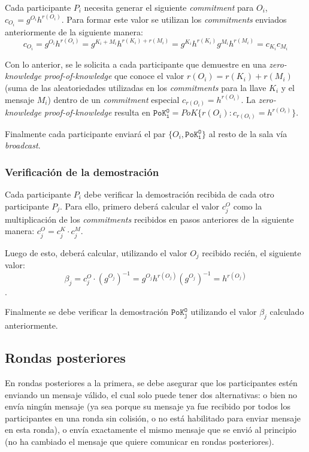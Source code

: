 Cada participante $P_i$ necesita generar el siguiente \emph{commitment} para 
$O_i$, $c_{O_i} = g^{O_i} h^{r(O_i)}$. Para formar este valor se utilizan los 
\emph{commitments} enviados anteriormente de la siguiente manera: 
$$c_{O_i} = g^{O_i} h^{r(O_i)} = g^{K_i + M_i} h^{r(K_i) + r(M_i)} = g^{K_i} 
h^{r(K_i)} g^{M_i} h^{r(M_i)} = c_{K_i} c_{M_i}$$

Con lo anterior, se le solicita a cada participante que demuestre en una 
\emph{zero-knowledge proof-of-knowledge} que conoce el valor 
$r(O_i) = r(K_i) + r(M_i)$ (suma de las aleatoriedades utilizadas en los 
\emph{commitments} para la llave $K_i$ y el mensaje $M_i$) dentro de un 
\emph{commitment} especial $c_{r(O_i)} = h^{r(O_i)}$. La 
\emph{zero-knowledge proof-of-knowledge} resulta en 
$\mathtt{PoK_i^O} = PoK\{r(O_i) : c_{r(O_i)} = h^{r(O_i)}\}$.

Finalmente cada participante enviará el par $\{O_i, \mathtt{PoK_i^O}\}$ al 
resto de la sala vía \emph{broadcast}.

\subsubsection{Verificación de la demostración}

Cada participante $P_i$ debe verificar la demostración recibida de cada otro 
participante $P_j$. Para ello, primero deberá calcular el valor $c_j^O$ como 
la multiplicación de los \emph{commitments} recibidos en pasos anteriores de 
la siguiente manera: $c_j^O = c_j^K \cdot c_j^M$.

Luego de esto, deberá calcular, utilizando el valor $O_j$ recibido recién, el 
siguiente valor: $$\beta_j = c_j^O \cdot (g^{O_j})^{-1} = g^{O_j} h^{r(O_j)} 
(g^{O_j})^{-1} = h^{r(O_j)}$$.

Finalmente se debe verificar la demostración $\mathtt{PoK_j^O}$ utilizando el 
valor $\beta_j$ calculado anteriormente.

\subsection{Rondas posteriores}

En rondas posteriores a la primera, se debe asegurar que los participantes 
estén enviando un mensaje válido, el cual solo puede tener dos alternativas: o 
bien no envía ningún mensaje (ya sea porque su mensaje ya fue recibido por 
todos los participantes en una ronda sin colisión, o no está habilitado para 
enviar mensaje en esta ronda), o envía exactamente el mismo mensaje que se 
envió al principio (no ha cambiado el mensaje que quiere comunicar en rondas 
posteriores).

